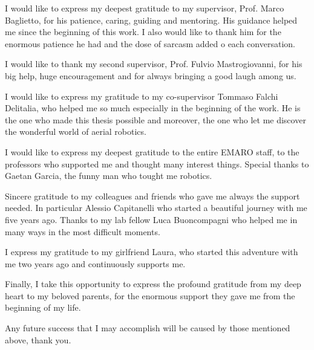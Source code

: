 

\begin{acknowledgements}


I would like to express my deepest gratitude to my supervisor, Prof. Marco Baglietto, for his patience, caring, guiding and mentoring. His guidance helped me since the beginning of this work. I also would like to thank him for the enormous patience he had and the dose of sarcasm added o each conversation. 

I would like to thank my second supervisor, Prof. Fulvio Mastrogiovanni, for his big help, huge encouragement and for always bringing a good laugh among us. 

I would like to express my gratitude to my co-supervisor Tommaso Falchi Delitalia, who helped me so much especially in the beginning of the work. He is the one who made this thesis possible and moreover, the one who let me discover the wonderful world of aerial robotics.

I would like to express my deepest gratitude to the entire EMARO staff, to the professors who supported me and thought many interest things. Special thanks to Gaetan Garcia, the funny man who tought me robotics. 

Sincere gratitude to my colleagues and friends who gave me always the support needed. In particular Alessio Capitanelli who started a beautiful journey with me five years ago. Thanks to my lab fellow Luca Buoncompagni who helped me in many ways in the most difficult moments.

I express my gratitude to my girlfriend Laura, who started this adventure with me two years ago and continuously supports me.
 
Finally, I take this opportunity to express the profound gratitude from my deep heart to my beloved parents, for the enormous support they gave me from the beginning of my life.

Any future success that I may accomplish will be caused by those mentioned above, thank you.
  


\end{acknowledgements}